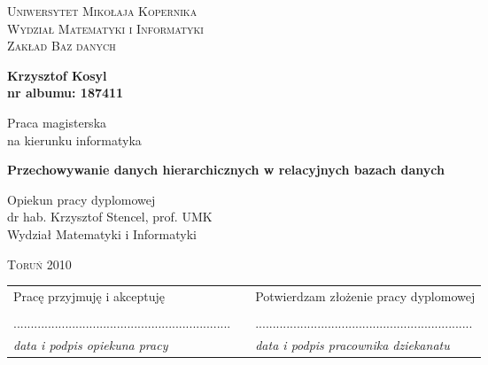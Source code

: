

\begin{titlepage}
    \begin{center}
        \Large\scshape Uniwersytet Mikołaja Kopernika\\
        Wydział Matematyki i Informatyki\\
        Zakład Baz danych
    \end{center}

	\vspace{12ex}

    \begin{center}
        \Large\bfseries
        Krzysztof Kosyl \\
        \vspace{0.5ex}
        \normalsize
        nr albumu: 187411
    \end{center}    
    
	\vspace{1ex}

    \begin{center}
    	Praca magisterska\\
		na kierunku informatyka
    \end{center}  
    
    \vspace{6ex}
    \begin{center}
        \Huge\bfseries
        Przechowywanie danych hierarchicznych w relacyjnych bazach danych
    \end{center}
    \vspace{12ex}
    
    

    \hspace*{\fill}
    \parbox{0.50\textwidth}{\setlength{\parindent}{1em}
            \normalsize
            \noindent
            Opiekun pracy dyplomowej\\
            dr hab. Krzysztof Stencel, prof. UMK\\
            Wydział Matematyki i Informatyki}
    \vfill
    \centerline{\textsc{Toruń} 2010}
    \vspace{12ex}
    
    {\noindent
    \small
    \begin{tabular}{ l l l }
    Pracę przyjmuję i akceptuję & \hspace{12mm} & Potwierdzam złożenie pracy dyplomowej \\
      &  &  \\
    ............................................................... &  & ............................................................... \\
    \textit{\small data i podpis opiekuna pracy} &  & \textit{\small data i podpis pracownika dziekanatu} \\
    
    \end{tabular}
    }
    \addtocounter{page}{-1}
\end{titlepage}

